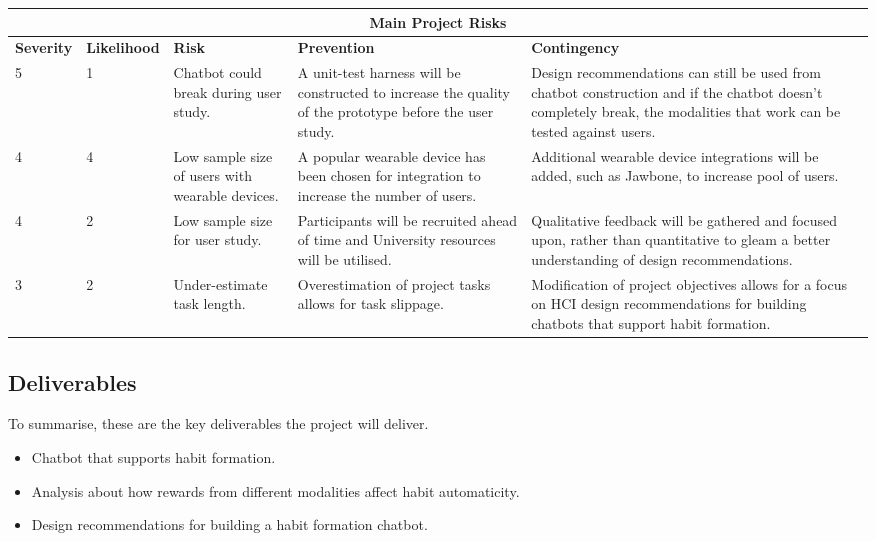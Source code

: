 \begin{center}
\begin{tabular}{ |p{1.5cm}|p{1.9cm}|p{2.3cm}|p{3.3cm}|p{5cm}| }
  \hline \multicolumn{5}{|c|}{Main Project Risks} \\ \hline %
  \textbf{Severity} & \textbf{Likelihood} & \textbf{Risk} & \textbf{Prevention} & \textbf{Contingency} \\ \hline %
  5 & 1 & Chatbot could break during user study. & A unit-test harness will be constructed to increase the quality of the prototype before the user study. & Design recommendations can still be used from chatbot construction and if the chatbot doesn't completely break, the modalities that work can be tested against users. \\ \hline
  4 & 4 & Low sample size of users with wearable devices. & A popular wearable device has been chosen for integration to increase the number of users. & Additional wearable device integrations will be added, such as Jawbone, to increase pool of users. \\ \hline
  4 & 2 & Low sample size for user study. & Participants will be recruited ahead of time and University resources will be utilised. & Qualitative feedback will be gathered and focused upon, rather than quantitative to gleam a better understanding of design recommendations.\\ \hline
  3 & 2 & Under-estimate task length. & Overestimation of project tasks allows for task slippage. & Modification of project objectives allows for a focus on HCI design recommendations for building chatbots that support habit formation. \\ \hline
\end{tabular}
\end{center}

\subsection{Deliverables}
To summarise, these are the key deliverables the project will deliver.

\begin{itemize}
  \item Chatbot that supports habit formation.
  \item Analysis about how rewards from different modalities affect habit automaticity.
  \item Design recommendations for building a habit formation chatbot.
\end{itemize}
